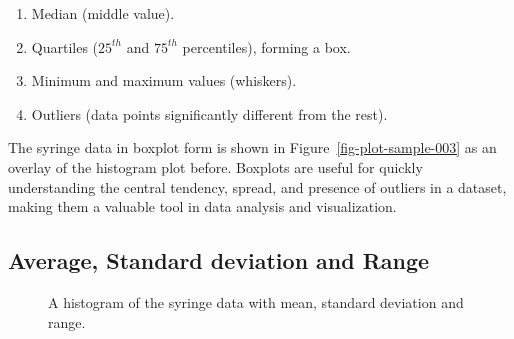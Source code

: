 \documentclass[
  a4paper,
]{scrbook}
\providecommand{\tightlist}{%
  \setlength{\itemsep}{0pt}\setlength{\parskip}{0pt}}\usepackage{longtable,booktabs,array}
\begin{document}
\begin{enumerate}
\def\labelenumi{\arabic{enumi}.}
\tightlist
\item
  Median (middle value).
\item
  Quartiles (\(25^{th}\) and \(75^{th}\) percentiles), forming a box.
\item
  Minimum and maximum values (whiskers).
\item
  Outliers (data points significantly different from the rest).
\end{enumerate}

The syringe data in boxplot form is shown in
Figure~\ref{fig-plot-sample-003} as an overlay of the histogram plot
before. Boxplots are useful for quickly understanding the central
tendency, spread, and presence of outliers in a dataset, making them a
valuable tool in data analysis and visualization.

\subsection{Average, Standard deviation and
Range}\label{average-standard-deviation-and-range}

\begin{figure}[ht]


\caption{\label{fig-plot-sample-031}A histogram of the syringe data with
mean, standard deviation and range.}

\end{figure}%
\end{document}
